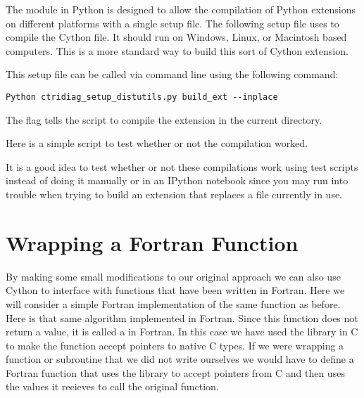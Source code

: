 

The  module in Python is designed to allow the compilation of Python extensions on different platforms with a single setup file.
The following setup file uses  to compile the Cython file.
It should run on Windows, Linux, or Macintosh based computers.
This is a more standard way to build this sort of Cython extension.



This setup file can be called via command line using the following command:
\begin{lstlisting}[style=ShellInput]
Python ctridiag_setup_distutils.py build_ext --inplace
\end{lstlisting}
The  flag tells the script to compile the extension in the current directory.

Here is a simple script to test whether or not the compilation worked.



\begin{info}
It is a good idea to test whether or not these compilations work using test scripts instead of doing it manually or in an IPython notebook since you may run into trouble when trying to build an extension that replaces a file currently in use.
\end{info}

\section*{Wrapping a Fortran Function}

By making some small modifications to our original approach we can also use Cython to interface with functions that have been written in Fortran.
Here we will consider a simple Fortran implementation of the same function as before.
Here is that same algorithm implemented in Fortran.
Since this function does not return a value, it is called a  in Fortran.
In this case we have used the  library in C to make the function accept pointers to native C types.
If we were wrapping a function or subroutine that we did not write ourselves we would have to define a Fortran function that uses the  library to accept pointers from C and then uses the values it recieves to call the original function.


